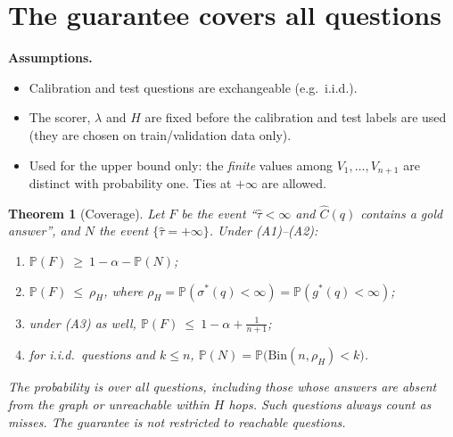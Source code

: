 \documentclass[11pt,a4paper]{article}
\newtheorem{theorem}{Theorem}
\theoremstyle{definition}
\theoremstyle{remark}
\newcommand{\Prob}{\mathbb{P}}
\newcommand{\tauhat}{\hat{\tau}}
\begin{document}
\section{The guarantee covers all questions}

\noindent\textbf{Assumptions.}
\begin{itemize}[nosep]
  \item[(A1)] Calibration and test questions are exchangeable (e.g.\ i.i.d.).
  \item[(A2)] The scorer, $\lambda$ and $H$ are fixed before the calibration and test labels are used (they are chosen on train/validation data only).
  \item[(A3)] Used for the upper bound only: the \emph{finite} values among $V_1,\dots,V_{n+1}$ are distinct with probability one. Ties at $+\infty$ are allowed.
\end{itemize}

\begin{theorem}[Coverage]\label{thm:cov}
Let $F$ be the event ``$\tauhat<\infty$ and $\hat C(q)$ contains a gold answer'', and $N$ the event $\{\tauhat=+\infty\}$. Under (A1)--(A2):
\begin{enumerate}[nosep,label=(\roman*)]
  \item $\Prob(F)\ \ge\ 1-\alpha-\Prob(N)$;
  \item $\Prob(F)\ \le\ \rho_H$, where $\rho_H=\Prob(\sigma^*(q)<\infty)=\Prob(g^*(q)<\infty)$;
  \item under (A3) as well, $\Prob(F)\ \le\ 1-\alpha+\frac{1}{n+1}$;
  \item for i.i.d.\ questions and $k\le n$, $\Prob(N)=\Prob\big(\mathrm{Bin}(n,\rho_H)<k\big)$.
\end{enumerate}
The probability is over \emph{all} questions, including those whose answers are absent from the graph or unreachable within $H$ hops. Such questions always count as misses. The guarantee is not restricted to reachable questions.
\end{theorem}
\end{document}
